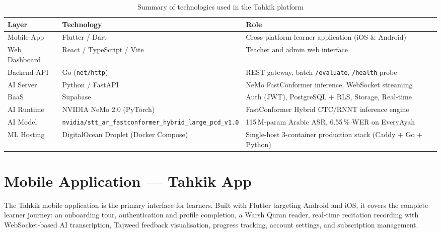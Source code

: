 \begin{table}[H]
  \centering
  \caption{Summary of technologies used in the Tahkik platform}
  \label{tab:impl_tech_summary}
  \renewcommand{\arraystretch}{1.4}
  \begin{tabular}{llp{7cm}}
    \toprule
    \textbf{Layer} & \textbf{Technology} & \textbf{Role} \\
    \midrule
    Mobile App     & Flutter / Dart            & Cross-platform learner application (iOS \& Android) \\
    Web Dashboard  & React / TypeScript / Vite & Teacher and admin web interface \\
    Backend API    & Go (\texttt{net/http})    & REST gateway, batch \texttt{/evaluate}, \texttt{/health} probe \\
    AI Server      & Python / FastAPI          & NeMo FastConformer inference, WebSocket streaming \\
    BaaS           & Supabase                  & Auth (JWT), PostgreSQL + RLS, Storage, Real-time \\
    AI Runtime     & NVIDIA NeMo 2.0 (PyTorch) & FastConformer Hybrid CTC/RNNT inference engine \\
    AI Model       & \texttt{nvidia/stt\_ar\_fastconformer\_hybrid\_large\_pcd\_v1.0} & 115\,M-param Arabic ASR, 6.55\,\% WER on EveryAyah \\
    ML Hosting     & DigitalOcean Droplet (Docker Compose) & Single-host 3-container production stack (Caddy + Go + Python) \\
    \bottomrule
  \end{tabular}
\end{table}

\section{Mobile Application — Tahkik App}
\label{sec:impl_mobile}

\begin{emeraldbox}[title=Mobile Application]
The Tahkik mobile application is the primary interface for learners. Built with Flutter targeting Android and iOS, it covers the complete learner journey: an onboarding tour, authentication and profile completion, a Warsh Quran reader, real-time recitation recording with WebSocket-based AI transcription, Tajweed feedback visualisation, progress tracking, account settings, and subscription management.
\end{emeraldbox}

